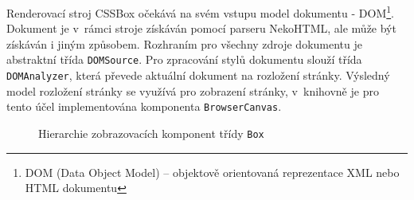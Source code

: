 Renderovací stroj CSSBox očekává na svém vstupu model dokumentu - DOM\footnote{DOM (Data Object Model) -- objektově orientovaná reprezentace XML nebo HTML dokumentu}. Dokument je v~rámci stroje získáván pomocí parseru NekoHTML, ale může být získáván i jiným způsobem. Rozhraním pro všechny zdroje dokumentu je abstraktní třída \texttt{DOMSource}. Pro zpracování stylů dokumentu slouží třída \texttt{DOMAnalyzer}, která převede aktuální dokument na rozložení stránky. Výsledný model rozložení stránky se využívá pro zobrazení stránky, v~knihovně je pro tento účel implementována komponenta \texttt{BrowserCanvas}.

\begin{figure}[H]
  \begin{center}
    \caption{Hierarchie zobrazovacích komponent třídy \texttt{Box}}
    \label{Figure.BoxHierarchy}
  \end{center}
\end{figure}

